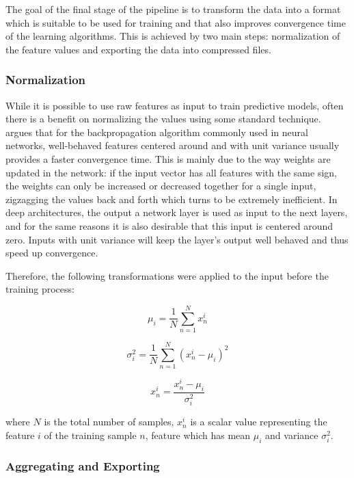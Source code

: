 \documentclass{kththesis}
\begin{document}
The goal of the final stage of the pipeline is to transform the data into a format which is suitable to be used for training and that also improves convergence time of the learning algorithms. This is achieved by two main steps: normalization of the feature values and exporting the data into compressed files.

\subsubsection{Normalization}

While it is possible to use raw features as input to train predictive models, often there is a benefit on normalizing the values using some standard technique. \citep{lecun2012efficient} argues that for the backpropagation algorithm commonly used in neural networks, well-behaved features centered around and with unit variance usually provides a faster convergence time. This is mainly due to the way weights are updated in the network: if the input vector has all features with the same sign, the weights can only be increased or decreased together for a single input, zigzagging the values back and forth which turns to be extremely inefficient. In deep architectures, the output a network layer is used as input to the next layers, and for the same reasons it is also desirable that this input is centered around zero. Inputs with unit variance will keep the layer's output well behaved and thus speed up convergence.

Therefore, the following transformations were applied to the input before the training process:

 \begin{equation}
 \mu_i = \frac{1}{N}\sum_{n=1}^{N}x_n^i
 \end{equation}

\begin{equation}
\sigma_i^2 = \frac{1}{N}\sum_{n=1}^{N}(x_n^i - \mu_i)^2
\end{equation}
 
\begin{equation}
x_n^i = \frac{x_n^i - \mu_i}{\sigma_i^2}
\end{equation}

where $N$ is the total number of samples, $x_n^i$ is a scalar value representing the feature $i$ of the training sample $n$, feature which has mean $\mu_i$ and variance $\sigma^2_i$.

\subsubsection{Aggregating and Exporting}
\end{document}
